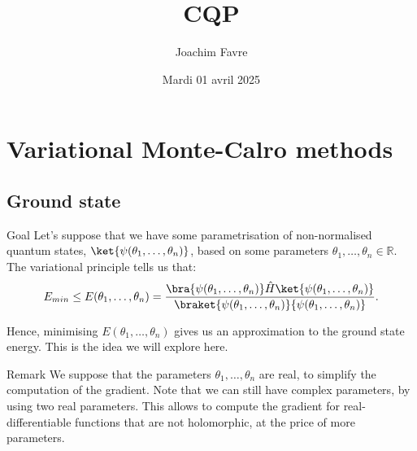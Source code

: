 \documentclass[a4paper]{article}
\title{CQP}
\author{Joachim Favre}
\date{Mardi 01 avril 2025}
\begin{document}
\maketitle


\section{Variational Monte-Calro methods}

\subsection{Ground state}

\begin{parag}{Goal}
    Let's suppose that we have some parametrisation of non-normalised quantum states, $\ket{\psi\left(\theta_1, \ldots, \theta_n\right)}$, based on some parameters $\theta_1, \ldots, \theta_n \in \mathbb{R}$. The variational principle tells us that:
    \[E_{min} \leq E\left(\theta_1, \ldots, \theta_n\right) = \frac{\bra{\psi\left(\theta_1, \ldots, \theta_n\right)} \hat{H} \ket{\psi\left(\theta_1, \ldots, \theta_n\right)}}{\braket{\psi\left(\theta_1,\ldots,\theta_n\right)}{\psi\left(\theta_1, \ldots, \theta_n\right)}}.\]

    Hence, minimising $E\left(\theta_1, \ldots, \theta_n\right)$ gives us an approximation to the ground state energy. This is the idea we will explore here.

    \begin{subparag}{Remark}
        We suppose that the parameters $\theta_1, \ldots, \theta_n$ are real, to simplify the computation of the gradient. Note that we can still have complex parameters, by using two real parameters. This allows to compute the gradient for real-differentiable functions that are not holomorphic, at the price of more parameters.
    \end{subparag}
\end{parag}
\end{document}

